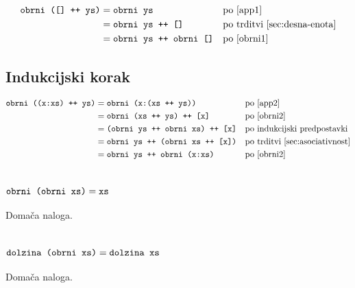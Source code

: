 \documentclass[11pt,a4paper]{article}
\begin{document}
\begin{align*}
  \mbox{\texttt{obrni ([] ++ ys)}}
  &= \mbox{\texttt{obrni ys}}
    &&\text{po \eqref{app1}} \\
  &= \mbox{\texttt{obrni ys ++ []}}
    &&\text{po trditvi~\ref{sec:desna-enota}} \\
  &= \mbox{\texttt{obrni ys ++ obrni []}}
    &&\text{po \eqref{obrni1}}
\end{align*}

\subsection*{Indukcijski korak}

\begin{align*}
  \mbox{\texttt{obrni ((x:xs) ++ ys)}}
  &= \mbox{\texttt{obrni (x:(xs ++ ys))}}
    &&\text{po \eqref{app2}} \\
  &= \mbox{\texttt{obrni (xs ++ ys) ++ [x]}}
    &&\text{po \eqref{obrni2}} \\
  &= \mbox{\texttt{(obrni ys ++ obrni xs) ++ [x]}}
    &&\text{po indukcijski predpostavki} \\
  &= \mbox{\texttt{obrni ys ++ (obrni xs ++ [x])}}
    &&\text{po trditvi~\ref{sec:asociativnost}} \\
  &= \mbox{\texttt{obrni ys ++ obrni (x:xs)}}
    &&\text{po \eqref{obrni2}}
\end{align*}


\section{$\mbox{\texttt{obrni (obrni xs)}} = \mbox{\texttt{xs}}$}

Domača naloga.

\section{$\mbox{\texttt{dolzina (obrni xs)}} = \mbox{\texttt{dolzina xs}}$}

Domača naloga.
\end{document}
